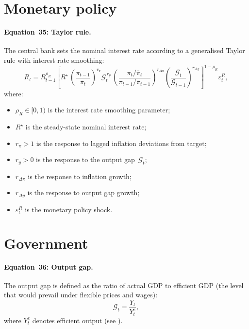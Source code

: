 \documentclass[11pt,a4paper]{article}
\newcommand{\bbar}[1]{\bar{#1}}
\begin{document}
\section{Monetary policy}
\label{sec:monetary}

\paragraph{Equation~35: Taylor rule.}
The central bank sets the nominal interest rate according to a generalised
Taylor rule with interest rate smoothing:
\begin{equation}\label{eq:eq35}\tag{Eq.~35}
  \boxed{
  R_t = R_{t-1}^{\rho_R}
  \left[
  R^{\star}\,
  \left(\frac{\pi_{t-1}}{\bbar\pi_t}\right)^{\!r_\pi}\!
  \mathcal{G}_t^{\,r_y}\,
  \left(\frac{\pi_t/\bbar\pi_t}{\pi_{t-1}/\bbar\pi_{t-1}}\right)^{\!r_{\Delta\pi}}\!
  \left(\frac{\mathcal{G}_t}{\mathcal{G}_{t-1}}\right)^{\!r_{\Delta y}}
  \right]^{1-\rho_R}
  \!\!\varepsilon^R_t,}
\end{equation}
where:
\begin{itemize}[nosep]
  \item $\rho_R \in [0,1)$ is the interest rate smoothing parameter;
  \item $R^{\star}$ is the steady-state nominal interest rate;
  \item $r_\pi > 1$ is the response to lagged inflation deviations from target;
  \item $r_y > 0$ is the response to the output gap~$\mathcal{G}_t$;
  \item $r_{\Delta\pi}$ is the response to inflation growth;
  \item $r_{\Delta y}$ is the response to output gap growth;
  \item $\varepsilon^R_t$ is the monetary policy shock.
\end{itemize}


\section{Government}
\label{sec:government}

\paragraph{Equation~36: Output gap.}
The output gap is defined as the ratio of actual GDP to efficient GDP
(the level that would prevail under flexible prices and wages):
\begin{equation}\label{eq:eq36}\tag{Eq.~36}
  \boxed{\mathcal{G}_t = \frac{Y_t}{Y^e_t},}
\end{equation}
where $Y^e_t$ denotes efficient output (see ).
\end{document}
